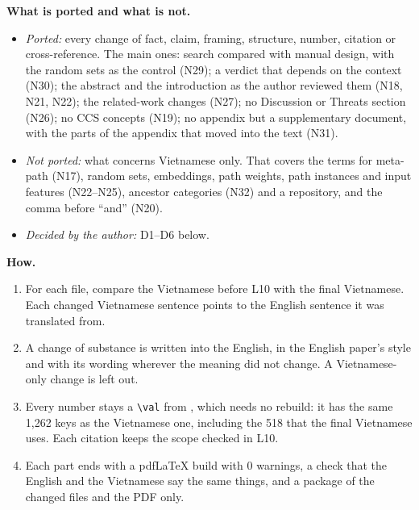 \documentclass[11pt,a4paper]{article}
\DeclareRobustCommand{\code}[1]{\texttt{\detokenize{#1}}}
\begin{document}
\textbf{What is ported and what is not.}
\begin{itemize}
  \item \emph{Ported:} every change of fact, claim, framing, structure, number, citation or
        cross-reference. The main ones: search compared with manual design, with the random sets as
        the control (N29); a verdict that depends on the context (N30); the abstract and the
        introduction as the author reviewed them (N18, N21, N22); the related-work changes (N27);
        no Discussion or Threats section (N26); no CCS concepts (N19); no appendix but a
        supplementary document, with the parts of the appendix that moved into the text (N31).
  \item \emph{Not ported:} what concerns Vietnamese only. That covers the terms for meta-path
        (N17), random sets, embeddings, path weights, path instances and input features
        (N22--N25), ancestor categories (N32) and a repository, and the comma before ``and'' (N20).
  \item \emph{Decided by the author:} D1--D6 below.
\end{itemize}

\textbf{How.}
\begin{enumerate}
  \item For each file, compare the Vietnamese before L10 with the final Vietnamese. Each changed
        Vietnamese sentence points to the English sentence it was translated from.
  \item A change of substance is written into the English, in the English paper's style and with
        its wording wherever the meaning did not change. A Vietnamese-only change is left out.
  \item Every number stays a \verb|\val| from \code{numbers.tex}, which needs no rebuild: it has the
        same 1,262 keys as the Vietnamese one, including the 518 that the final Vietnamese uses.
        Each citation keeps the scope checked in L10.
  \item Each part ends with a pdfLaTeX build with 0 warnings, a check that the English and the
        Vietnamese say the same things, and a package of the changed files and the PDF only.
\end{enumerate}
\end{document}
